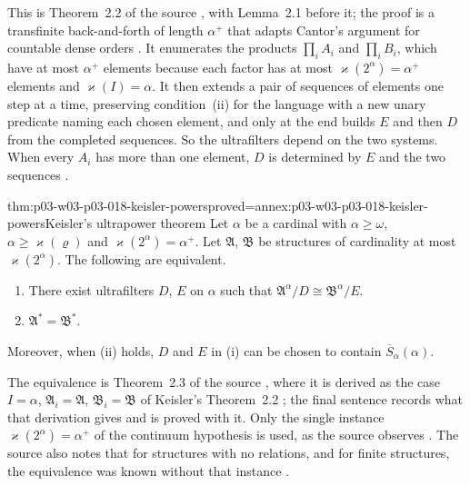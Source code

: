 This is Theorem~2.2 of the source \cite[484]{Keisler1961ElementaryClasses}, with Lemma~2.1 before it; the proof
\cite[484--486]{Keisler1961ElementaryClasses} is a transfinite back-and-forth
of length \(\alpha^+\) that adapts Cantor's argument for countable dense
orders \cite[486, footnote~3]{Keisler1961ElementaryClasses}.  It enumerates
the products \(\prod_iA_i\) and \(\prod_iB_i\), which have at most
\(\alpha^+\) elements because each factor has at most
\(\varkappa(2^\alpha)=\alpha^+\) elements and \(\varkappa(I)=\alpha\).  It then
extends a pair of sequences of elements one step at a time, preserving
condition~(ii) for the language with a new unary predicate naming each chosen
element, and only at the end builds \(E\) and then \(D\) from the completed
sequences.  So the ultrafilters depend on the two systems.  When every
\(A_i\) has more than one element, \(D\) is determined by \(E\) and the two
sequences \cite[486]{Keisler1961ElementaryClasses}.

\begin{hbtheorem}{thm:p03-w03-p03-018-keisler-powers}{proved=annex:p03-w03-p03-018-keisler-powers}{Keisler's ultrapower theorem}
Let \(\alpha\) be a cardinal with \(\alpha\ge\omega\),
\(\alpha\ge\varkappa(\varrho)\) and \(\varkappa(2^\alpha)=\alpha^+\).  Let
\(\mathfrak A\), \(\mathfrak B\) be structures of cardinality at most
\(\varkappa(2^\alpha)\).  The following are equivalent.
\begin{enumerate}
  \item[(i)] There exist ultrafilters \(D\), \(E\) on \(\alpha\) such that
        \(\mathfrak A^\alpha/D\cong\mathfrak B^\alpha/E\).
  \item[(ii)] \(\mathfrak A^*=\mathfrak B^*\).
\end{enumerate}
Moreover, when (ii) holds, \(D\) and \(E\) in (i) can be chosen to contain
\(\overline S_\alpha(\alpha)\).
\end{hbtheorem}

The equivalence is Theorem~2.3 of the source \cite[486]{Keisler1961ElementaryClasses}, where it is
derived as the case \(I=\alpha\), \(\mathfrak A_i=\mathfrak A\),
\(\mathfrak B_i=\mathfrak B\) of Keisler's Theorem~2.2
\cite[487]{Keisler1961ElementaryClasses}; the final sentence records what
that derivation gives and is proved with it.  Only the single instance
\(\varkappa(2^\alpha)=\alpha^+\) of the continuum hypothesis is used, as the
source observes \cite[487]{Keisler1961ElementaryClasses}.  The source also
notes that for structures with no relations, and for finite structures, the
equivalence was known without that instance
\cite[486, footnote~4]{Keisler1961ElementaryClasses}.

